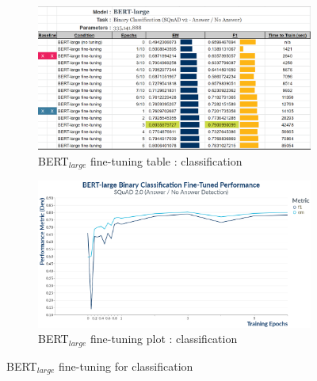 \begin{figure}[h]
	\centering
	\begin{subfigure}{0.95\textwidth}%
		\centering
		\includegraphics[width=\linewidth]{images/classification/BERT_Large_Training.png}%
		\caption{BERT$_{large}$ fine-tuning table : classification}
	\end{subfigure}%
	
	\vspace*{8pt}%
	
	\begin{subfigure}{0.96\textwidth}%
		\centering
		\includegraphics[width=\linewidth]{images/BinaryClassification_BERT_Training_Performance_plot.png}%
		\caption{BERT$_{large}$ fine-tuning plot : classification}
	\end{subfigure}%
	\caption{\label{apdx:BERT_fine_tuning_classification}BERT$_{large}$ fine-tuning for classification}
\end{figure}%

